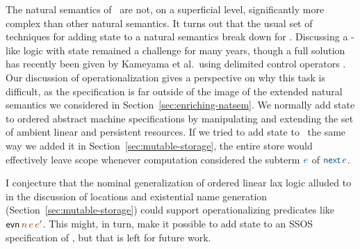 The natural semantics of \rowan~are not, on a superficial level,
significantly more complex than other natural semantics.  It turns out
that the usual set of techniques for adding state to a natural
semantics break down for \rowan. Discussing a \rowan-like logic with
state remained a challenge for many years, though a full solution has
recently been given by Kameyama et al.~using delimited control
operators \cite{kameyama11shifting}. Our discussion of
operationalization gives a perspective on why this task is difficult,
as the specification is far outside of the image of the extended
natural semantics we considered in Section~\ref{sec:enriching-natsem}.
We normally add state to ordered abstract machine specifications by
manipulating and extending the set of ambient linear and persistent
resources.  If we tried to add state to \rowan~the same way we added
it in Section~\ref{sec:mutable-storage}, the entire store would
effectively leave scope whenever computation considered the subterm
$\obj{e}$ of $\obj{{\sf next}\,e}$.

I conjecture that the nominal generalization of ordered linear lax
logic alluded to in the discussion of locations and existential name
generation (Section~\ref{sec:mutable-storage}) could support
operationalizing predicates like ${\sf
  evn}\,\lf{n}\,\lf{e}\,\lf{e'}$. This might, in turn, make it
possible to add state to an SSOS specification of \rowan, but that is
left for future work.
